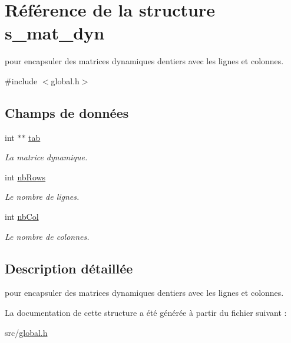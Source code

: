 \hypertarget{structs__mat__dyn}{}\section{Référence de la structure s\+\_\+mat\+\_\+dyn}
\label{structs__mat__dyn}


pour encapsuler des matrices dynamiques d\textquotesingle{}entiers avec les lignes et colonnes.  




{\ttfamily \#include $<$global.\+h$>$}

\subsection*{Champs de données}
\begin{DoxyCompactItemize}
\item 
\mbox{\label{structs__mat__dyn_ad49bf24c5f929d1ed8e22fee5935834b}} 
int $\ast$$\ast$ \hyperlink{structs__mat__dyn_ad49bf24c5f929d1ed8e22fee5935834b}{tab}
\begin{DoxyCompactList}\small\item\em La matrice dynamique. \end{DoxyCompactList}\item 
\mbox{\label{structs__mat__dyn_a79216b74e382c29c63ee9be03b8eda5f}} 
int \hyperlink{structs__mat__dyn_a79216b74e382c29c63ee9be03b8eda5f}{nb\+Rows}
\begin{DoxyCompactList}\small\item\em Le nombre de lignes. \end{DoxyCompactList}\item 
\mbox{\label{structs__mat__dyn_a6469383d7383132548299002f54d4524}} 
int \hyperlink{structs__mat__dyn_a6469383d7383132548299002f54d4524}{nb\+Col}
\begin{DoxyCompactList}\small\item\em Le nombre de colonnes. \end{DoxyCompactList}\end{DoxyCompactItemize}


\subsection{Description détaillée}
pour encapsuler des matrices dynamiques d\textquotesingle{}entiers avec les lignes et colonnes. 

La documentation de cette structure a été générée à partir du fichier suivant \+:\begin{DoxyCompactItemize}
\item 
src/\hyperlink{global_8h}{global.\+h}\end{DoxyCompactItemize}
